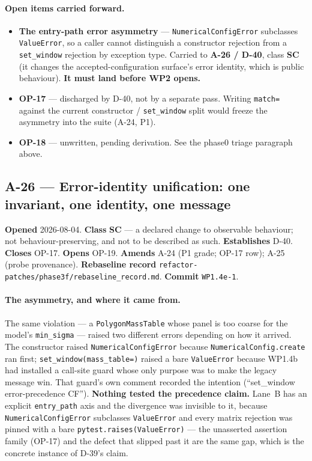 \documentclass[
  10pt,
]{article}
\providecommand{\tightlist}{%
  \setlength{\itemsep}{0pt}\setlength{\parskip}{0pt}}
\begin{document}
\paragraph{Open items carried forward.}
\begin{itemize}
\tightlist
\item \textbf{The entry-path error asymmetry} --- \texttt{NumericalConfigError} subclasses \texttt{ValueError}, so a caller cannot distinguish a constructor rejection from a \texttt{set\_window} rejection by exception type. Carried to \textbf{A-26 / D-40}, class \textbf{SC} (it changes the accepted-configuration surface's error identity, which is public behaviour). \textbf{It must land before WP2 opens.}
\item \textbf{OP-17} --- discharged by D-40, not by a separate pass. Writing \texttt{match=} against the current constructor / \texttt{set\_window} split would freeze the asymmetry into the suite (A-24, P1).
\item \textbf{OP-18} --- unwritten, pending derivation. See the phase0 triage paragraph above.
\end{itemize}


\hypertarget{a-26}{%
\subsection{A-26 --- Error-identity unification: one invariant, one identity, one message}\label{a-26}}

\textbf{Opened} 2026-08-04. \textbf{Class} \textbf{SC} --- a declared change to observable behaviour; not behaviour-preserving, and not to be described as such. \textbf{Establishes} D-40. \textbf{Closes} OP-17. \textbf{Opens} OP-19. \textbf{Amends} A-24 (P1 grade; OP-17 row); A-25 (probe provenance). \textbf{Rebaseline record} \texttt{refactor-patches/phase3f/rebaseline\_record.md}. \textbf{Commit} \texttt{WP1.4e-1}.

\paragraph{The asymmetry, and where it came from.}
The same violation --- a \texttt{PolygonMassTable} whose panel is too coarse for the model's \texttt{min\_sigma} --- raised two different errors depending on how it arrived. The constructor raised \texttt{NumericalConfigError} because \texttt{NumericalConfig.create} ran first; \texttt{set\_window(mass\_table=)} raised a bare \texttt{ValueError} because WP1.4b had installed a call-site guard whose only purpose was to make the legacy message win. That guard's own comment recorded the intention (``set\_window error-precedence CF''). \textbf{Nothing tested the precedence claim.} Lane~B has an explicit \texttt{entry\_path} axis and the divergence was invisible to it, because \texttt{NumericalConfigError} subclasses \texttt{ValueError} and every matrix rejection was pinned with a bare \texttt{pytest.raises(ValueError)} --- the unasserted assertion family (OP-17) and the defect that slipped past it are the same gap, which is the concrete instance of D-39's claim.
\end{document}
